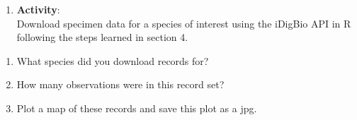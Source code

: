 \documentclass[
]{book}
\providecommand{\tightlist}{%
  \setlength{\itemsep}{0pt}\setlength{\parskip}{0pt}}
\begin{document}
\begin{enumerate}
\def\labelenumi{\arabic{enumi}.}
\setcounter{enumi}{4}
\tightlist
\item
  \textbf{Activity}:\\
  Download specimen data for a species of interest using the iDigBio API in R following the steps learned in section 4.
\end{enumerate}

\begin{enumerate}
\def\labelenumi{\alph{enumi}.}
\tightlist
\item
  What species did you download records for?
\item
  How many observations were in this record set?
\item
  Plot a map of these records and save this plot as a jpg.
\end{enumerate}

  
\end{document}
